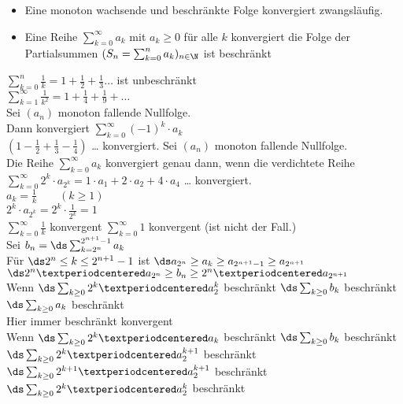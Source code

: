 %
\begin{itemize}
    \item{Eine monoton wachsende und beschränkte Folge konvergiert zwangsläufig.}
    \item{Eine Reihe $\sum_{k=0}^{∞} a_k$ mit $a_k \geq 0$ für alle $k$ konvergiert \equ die Folge der Partialsummen $(S_n = \sum_{k=0}^{n} a_k)_{n \in \N}$ ist beschränkt}
\end{itemize}
%
\bsp
    $\sum_{k=0}^{n} \frac{1}{k} = 1 + \frac{1}{2} + \frac{1}{3} …$ ist unbeschränkt\\
\bsp
    $\sum_{k=1}^{\infty} \frac{1}{k^2} = 1 + \frac{1}{4} + \frac{1}{9}+…$\\
    Sei $(a_n)$ monoton fallende Nullfolge.\\
    Dann konvergiert $\sum_{k=0}^{∞} (-1)^k \cdot a_k$\\
\bsp
    $(1 - \frac{1}{2} + \frac{1}{3} - \frac{1}{4})$ … konvergiert.
Sei $(a_n)$ monoton fallende Nullfolge.\\
Die Reihe $\sum_{k=0}^{\infty} a_k$ konvergiert genau dann, wenn die verdichtete Reihe $\sum_{k=0}^{\infty} 2^k \cdot a_{2^k} = 1 · a_1 + 2 · a_2 + 4 \cdot a_4$ … konvergiert.\\
%
\bsp
    $a_k = \frac{1}{k}\qquad (k \geq 1)$\\
    $2^k \cdot a_{2^k} = 2^k \cdot \frac{1}{2^k} = 1$\\
%
$\sum_{k=0}^\infty \frac{1}{k}$ konvergent \equ $\sum_{k=0}^\infty 1$ konvergent (ist nicht der Fall.)\\
\bew
Sei $b_n = \ds\sum_{k=2^n}^{2^{n+1}-1} a_k$\\
Für $\ds 2^n \leq k \leq 2^{n+1} - 1$ ist $\ds a_{2^n} \geq a_{k} \geq a_{2^{n+1} - 1} \geq a_{2^{n+1}}$ \Rarr $\ds 2^n · a_{2^n} \geq b_n \geq  2^n · a_{2^{n+1}}$\\
Wenn $\ds \sum_{k \geq 0} 2^k · a_2^k$ beschränkt \Rarr $\ds \sum_{k \geq 0} b_k$ beschränkt \Rarr $\ds \sum_{k \geq 0} a_k$ beschränkt\\
Hier immer beschränkt \equ konvergent\\
Wenn $\ds \sum_{k \geq 0} 2^k · a_k$ beschränkt \Rarr $\ds \sum_{k \geq 0} b_k$ beschränkt \Rarr $\ds \sum_{k \geq 0} 2^{k} · a_2^{k+1}$ beschränkt \equ $\ds \sum_{k \geq 0} 2^{k+1} · a_2^{k+1}$ beschränkt \equ $\ds \sum_{k \geq 0} 2^{k} · a_2^{k}$ beschränkt\\
